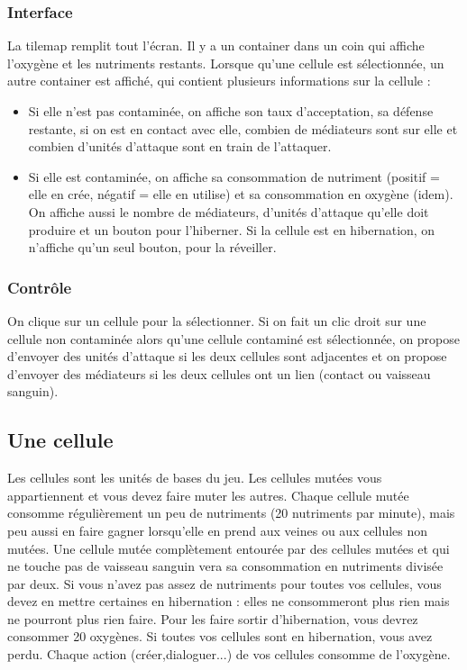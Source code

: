 \documentclass{article}
\begin{document}
\subsubsection{Interface}
La tilemap remplit tout l'écran. Il y a un container dans un coin qui affiche l'oxygène et les nutriments restants. Lorsque qu'une cellule est sélectionnée, un autre container est affiché, qui contient plusieurs informations sur la cellule :
\begin{itemize}
	\item Si elle n'est pas contaminée, on affiche son taux d'acceptation, sa défense restante, si on est en contact avec elle, combien de médiateurs sont sur elle et combien d'unités d'attaque sont en train de l'attaquer.
	\item Si elle est contaminée, on affiche sa consommation de nutriment (positif = elle en crée, négatif = elle en utilise) et sa consommation en oxygène (idem). On affiche aussi le nombre de médiateurs, d'unités d'attaque qu'elle doit produire et un bouton pour l'hiberner. Si la cellule est en hibernation, on n'affiche qu'un seul bouton, pour la réveiller.
\end{itemize}

\subsubsection{Contrôle}
On clique sur un cellule pour la sélectionner. Si on fait un clic droit sur une cellule non contaminée alors qu'une cellule contaminé est sélectionnée, on propose d'envoyer des unités d'attaque si les deux cellules sont adjacentes et on propose d'envoyer des médiateurs si les deux cellules ont un lien (contact ou vaisseau sanguin).

\subsection{Une cellule}\label{cellule}
Les cellules sont les unités de bases du jeu. Les cellules mutées vous appartiennent et vous devez faire muter les autres. Chaque cellule mutée consomme régulièrement un peu de nutriments (20 nutriments par minute), mais peu aussi en faire gagner lorsqu'elle en prend aux veines ou aux cellules non mutées. Une cellule mutée complètement entourée par des cellules mutées et qui ne touche pas de vaisseau sanguin vera sa consommation en nutriments divisée par deux. Si vous n'avez pas assez de nutriments pour toutes vos cellules, vous devez en mettre certaines en hibernation : elles ne consommeront plus rien mais ne pourront plus rien faire. Pour les faire sortir d'hibernation, vous devrez consommer 20 oxygènes. Si toutes vos cellules sont en hibernation, vous avez perdu. Chaque action (créer,dialoguer...) de vos cellules consomme de l'oxygène.
\end{document}
